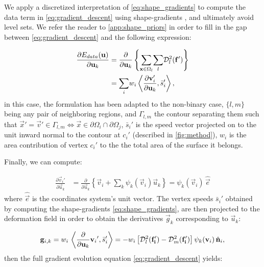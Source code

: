 We apply a discretized interpretation of \eqref{eq:shape_gradients} to compute
  the data term in \eqref{eq:gradient_descent} using shape-gradients
  \citep{herbulot_segmentation_2006}, and ultimately avoid level sets.
We refer the reader to \ref{app:shape_priors} in order to fill in the gap
  between \eqref{eq:gradient_descent} and the following expression:

  \begin{align}
  \frac{\partial E_{data}(\vec{u})}{\partial \vec{u}_k} &=
  \frac{ \partial }{\partial \vec{u}_k} \left\{
   \underset{\vec{x} \in \Omega_l}{\sum} \underset{l}{\sum} \mdist{f'}{l} \right\} \notag\\
  &= \underset{i}{\sum} w_i
   \left\langle \frac{\partial \vec{v}_i'}{\partial \vec{u}_k}, \bar{s}_i'\right\rangle,
  \label{eq:gradient_wshape}
  \end{align}
%
  in this case, the formulation has been adapted to the non-binary case, $\{l,m\}$
    being any pair of neighboring regions, and $\Gamma_{l,m}$ the contour separating
    them such that
    $\vec{x}' = \vec{v}' \in\Gamma_{l,m} \iff \vec{x}\in \partial\Omega_i \cap \partial\Omega_j$,
    $\bar{s}_i'$ is the speed vector projected on to the unit inward normal to the contour
    at $c_i'$ (described in \autoref{fig:method}), $w_i$ is the area contribution of vertex
    $c_i'$ to the the total area of the surface it belongs.


Finally, we can compute:

  \begin{align}
  \frac{\partial \vec{v}_i'}{\partial \vec{u}_k} &= \frac{\partial}{\partial \vec{u}_k}
  \left\{ \vec{v}_i + \sum_k \psi_k(\vec{v}_i) \vec{u}_k \right\}
  = \psi_k(\vec{v}_i)\, \hat{\vec{e}}
  \label{eq:basis_derivative}
  \end{align}
%
  where $\hat{\vec{e}}$ is the coordinates system's unit vector.
The vertex speeds $\bar{s}_i'$ obtained by computing the shape-gradients \eqref{eq:shape_gradients},
	are then projected to the deformation field in order to obtain the derivatives $\vec{g}_k$
	corresponding to $\vec{u}_k$:

  \begin{equation}
  \vec{g}_{i,k} = w_i \, \left\langle \frac{\partial}{\partial \vec{u}_k}{\vec{v}_i}', \bar{s}_i'\right\rangle
  = - w_i \left[ \mdist{f_i'}{l} - \mdist{f_i'}{m} \right] \psi_k(\vec{v}_i)\, \hat{\vec{n}}_i,
  \end{equation}
%
  then the full gradient evolution equation \eqref{eq:gradient_descent} yields:

